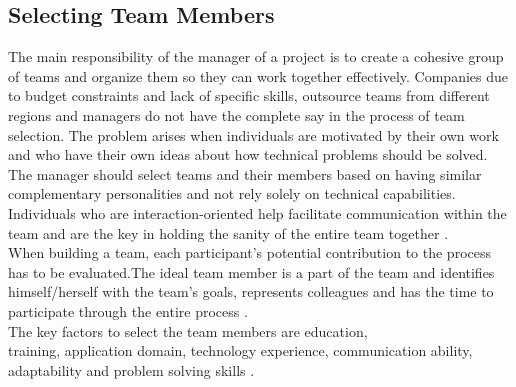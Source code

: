 \documentclass[sigplan,screen]{acmart}
\begin{document}
\subsection{Selecting Team Members}
The main responsibility of the manager of a project is to create a cohesive group of teams and organize them so they can work together effectively. Companies due to budget constraints and lack of specific skills, outsource teams from different regions and managers do not have the complete say in the process of team selection. The problem arises when individuals are motivated by their own work and who have their own ideas about how technical problems should be solved. The manager should select teams and their members based on having similar complementary personalities and not rely solely on technical capabilities. Individuals who are interaction-oriented help facilitate communication within the team and are the key in holding the sanity of the entire team together \cite{Somerville}. \\
When building a team, each participant's potential contribution to the process has to be evaluated.The ideal team member is a part of the team and identifies himself/herself with the team's goals, represents colleagues and has the time to participate through the entire process \cite{Gautam17}.\\
The key factors to select the team members are education,\\
training, application domain, technology experience, communication ability, adaptability and problem solving skills \cite{Somerville}.
\end{document}
